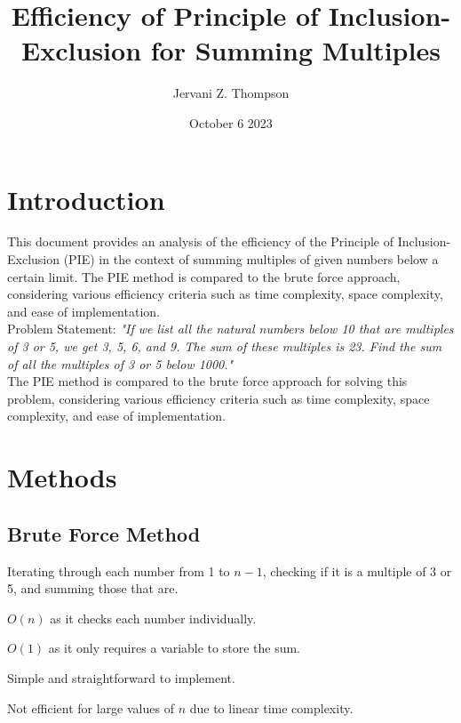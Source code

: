 \documentclass{article}
\title{Efficiency of Principle of Inclusion-Exclusion for Summing Multiples}
\author{Jervani Z. Thompson }
\date{October 6 2023}
\begin{document}
\maketitle

\section*{Introduction}
This document provides an analysis of the efficiency of the Principle of Inclusion-Exclusion (PIE) in the context of summing multiples of given numbers below a certain limit. The PIE method is compared to the brute force approach, considering various efficiency criteria such as time complexity, space complexity, and ease of implementation.\\

Problem Statement: \textit{"If we list all the natural numbers below 10 that are multiples of 3 or 5, we get 3, 5, 6, and 9. The sum of these multiples is 23. Find the sum of all the multiples of 3 or 5 below 1000."}\\

The PIE method is compared to the brute force approach for solving this problem, considering various efficiency criteria such as time complexity, space complexity, and ease of implementation.

\section*{Methods}
\subsection*{Brute Force Method}
\begin{description}[font=\normalfont,align=left]
    \item[Approach:] Iterating through each number from 1 to \(n-1\), checking if it is a multiple of 3 or 5, and summing those that are.
    \item[Time Complexity:] \(O(n)\) as it checks each number individually.
    \item[Space Complexity:] \(O(1)\) as it only requires a variable to store the sum.
    \item[Pros:] Simple and straightforward to implement.
    \item[Cons:] Not efficient for large values of \(n\) due to linear time complexity.
\end{description}
\end{document}

